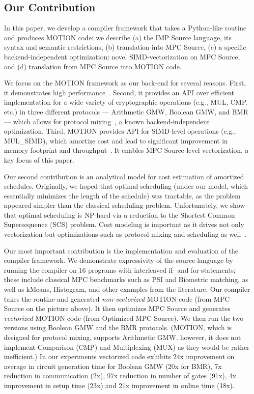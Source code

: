 \subsection{Our Contribution} In this paper, we develop a compiler framework that takes a Python-like routine and produces MOTION code: we describe (a) the IMP Source language, its syntax and semantic restrictions, (b) translation into MPC Source, (c) a specific backend-independent optimization: novel SIMD-vectorization on MPC Source, and (d) translation from MPC Source into MOTION code. %

We focus on the MOTION framework as our back-end for several reasons. First, it demonstrates high performance~\cite{Braun:2022}. Second, it provides an API over efficient implementation for a wide variety of cryptographic operations (e.g., MUL, CMP, etc.) in three different protocols ---  Arithmetic GMW, Boolean GMW, and BMR --- which allows for protocol mixing~\cite{CCS:BDKKS18,Ishaq:2019, Fang:2022}, a known backend-independent optimization. Third, MOTION provides API for SIMD-level operations (e.g., MUL\_SIMD), which amortize cost and lead to significant improvement in memory footprint and throughput~\cite{NDSS:DemSchZoh15, CCS:ABFKLO18, Braun:2022}. It enables MPC Source-level vectorization, a key focus of this paper.

Our second contribution is an analytical model for cost estimation of amortized schedules. Originally, we hoped that optimal scheduling (under our model, which essentially minimizes the length of the schedule) was tractable, as the problem appeared simpler than the classical scheduling problem. Unfortunately, we show that optimal scheduling is NP-hard via a reduction to the Shortest Common Supersequence (SCS) problem. Cost modeling is important as it drives not only vectorization but optimizations such as protocol mixing and scheduling as well~\cite{CCS:BDKKS18,Ishaq:2019, Fang:2022}.

Our most important contribution is the implementation and evaluation of the compiler framework. We demonstrate expressivity of the source language by running the compiler on 16 programs with interleaved if- and for-statements; these include classical MPC benchmarks such as PSI and Biometric matching, as well as kMeans, Histogram, and other examples from the literature. 
Our compiler takes the routine and generated \emph{non-vectorized} MOTION code (from MPC Source on the picture above). It then optimizes MPC Source and generates 
\emph{vectorized} MOTION code (from Optimized MPC Source). We then run the two versions using Boolean GMW and the BMR protocols. (MOTION, which is designed for 
protocol mixing, supports Arithmetic GMW, however, it does not implement Comparison (CMP) and Multiplexing (MUX) as they would be rather inefficient.)
In our experiments vectorized code exhibits 24x improvement on average in circuit generation time for Boolean GMW (20x for BMR), 7x reduction 
in communication (2x), 97x reduction in number of gates (91x), 4x improvement in setup time (23x) and 21x improvement in online time (18x).

